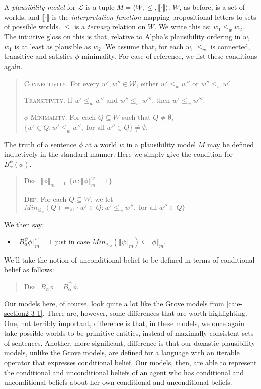 A \textit{plausibility model}  for $\mathcal{L}$ is a tuple $M = \langle W, \leq, \llbracket \cdot \rrbracket \rangle$.
$W$, as before, is a set of worlds, and $\llbracket \cdot \rrbracket$ is the \textit{interpretation function} mapping propositional letters to sets of possible worlds.
$\leq$ is a \textit{ternary} relation on $W$.
We write this as: $w_1 \leq_w w_2$.
The intuitive gloss on this is that, relative to Alpha's plausibility ordering in $w$, $w_1$ is at least as plausible as $w_2$.
We assume that, for each $w$, $\leq_w$ is connected, transitive and satisfies $\phi$-minimality.
For ease of reference, we list these conditions again.
\begin{quote}
\textsc{Connectivity.}\; For every $w', w'' \in \mathcal{W}$, either $w' \leq_w w''$ or $w'' \leq_w w'$.

\textsc{Transitivity.}\; If $w' \leq_w w''$ and $w'' \leq_w w'''$, then $w' \leq_w w'''$.

\textsc{$\phi$-Minimality.}\; For each $Q \subseteq W$ such that $Q \neq \emptyset$, $\{w' \in Q: w' \leq_w w'', \; \text{for all} \; w'' \in  Q \} \neq \emptyset$.
\end{quote}

The truth of a sentence $\phi$ at a world $w$ in a plausibility model $M$ may be defined inductively in the standard manner.
Here we simply give the condition for $B^\psi_\alpha(\phi)$.
\begin{quote}
\textsc{Def.}\; $\llbracket \phi \rrbracket_m =_{\text{df}} \{w: \llbracket \phi \rrbracket_m^w = 1 \}$.

\textsc{Def.}\; For each $Q \subseteq W$, we let $Min_{\leq_w}(Q) =_{\text{df}} \{w' \in Q: w' \leq_w w'', \; \text{for all} \; w'' \in  Q \}$
\end{quote}
We then say:
\begin{itemize}
\item[] $\llbracket B^\psi_\alpha \phi \rrbracket^w_m = 1$ just in case $Min_{\leq_w}(\llbracket \psi \rrbracket_m) \subseteq \llbracket \phi \rrbracket_m$.
\end{itemize}

We'll take the notion of unconditional belief to be defined in terms of conditional belief as follows:
\begin{quote}
\textsc{Def.}\; $B_\alpha \phi = B_\alpha^\top \phi$.
\end{quote}

Our models here, of course, look quite a lot like the Grove models from \autoref{caie-section2-3-1}. 
There are, however, some differences that are worth highlighting.
One, not terribly important, difference is that, in these models, we once again take possible worlds to be primitive entities, instead of maximally consistent sets of sentences.
Another, more significant, difference is that our doxastic plausibility models, unlike the Grove models, are defined for a language with an iterable operator that expresses conditional belief.
Our models, then, are able to represent the conditional and unconditional beliefs of an agent who has conditional and unconditional beliefs about her own conditional and unconditional beliefs.


